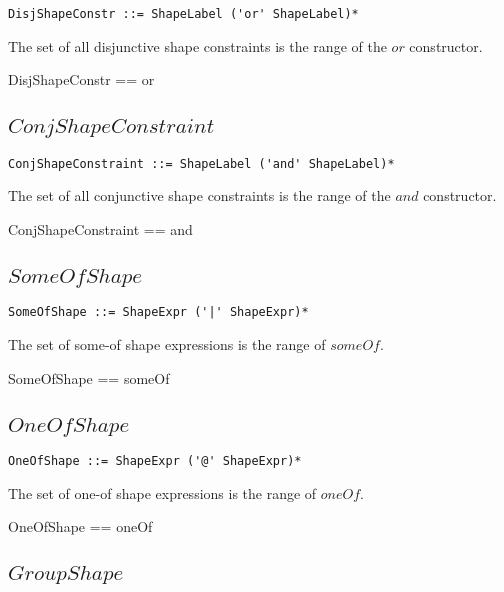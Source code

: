 \documentclass{article}
\begin{document}
\begin{verbatim}
DisjShapeConstr ::= ShapeLabel ('or' ShapeLabel)*
\end{verbatim}

The set of all disjunctive shape constraints is the range of the $or$ constructor.
\begin{zed}
	DisjShapeConstr == \ran or
\end{zed}

\subsection{$ConjShapeConstraint$}

\begin{verbatim}
ConjShapeConstraint ::= ShapeLabel ('and' ShapeLabel)*
\end{verbatim}

The set of all conjunctive shape constraints is the range of the $and$ constructor.
\begin{zed}
	ConjShapeConstraint == \ran and
\end{zed}

\subsection{$SomeOfShape$}

\begin{verbatim}
SomeOfShape ::= ShapeExpr ('|' ShapeExpr)*
\end{verbatim}

The set of some-of shape expressions is the range of $someOf$.
\begin{zed}
	SomeOfShape == \ran someOf
\end{zed}

\subsection{$OneOfShape$}

\begin{verbatim}
OneOfShape ::= ShapeExpr ('@' ShapeExpr)* 
\end{verbatim}

The set of one-of shape expressions is the range of $oneOf$.
\begin{zed}
	OneOfShape == \ran oneOf
\end{zed}

\subsection{$GroupShape$}
\end{document}
